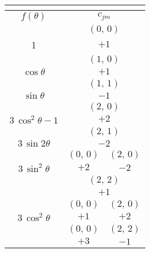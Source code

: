 \begin{table}[p]
  \centering
  \begin{tabular}{| c | c | c |}
    \multicolumn{1}{c}{\hspace*{6em}} & \multicolumn{1}{c}{\hspace*{4em}}
      & \multicolumn{1}{c}{\hspace*{4em}} \\
    \hline

    $f(\theta)$  &  \multicolumn{2}{c|}{$c_{jm}$} \\
    \hline\hline

       &  \multicolumn{2}{c|}{$(0,\,0)$}  \\
    \cline{2-3}
    1  &  \multicolumn{2}{c|}{$+1$}       \\
    \hline

       &  \multicolumn{2}{c|}{$(1,\,0)$}        \\
    \cline{2-3}
    $\cos\theta$  &  \multicolumn{2}{c|}{$+1$}  \\
    \hline

       &  \multicolumn{2}{c|}{$(1,\,1)$}        \\
    \cline{2-3}
    $\sin\theta$  &  \multicolumn{2}{c|}{$-1$}  \\
    \hline

       &  \multicolumn{2}{c|}{$(2,\,0)$}               \\
    \cline{2-3}
    $3\,\cos^2\theta-1$  &  \multicolumn{2}{c|}{$+2$}  \\
    \hline

       &  \multicolumn{2}{c|}{$(2,\,1)$}             \\
    \cline{2-3}
    $3\,\sin2\theta$  &  \multicolumn{2}{c|}{$-2$}  \\
    \hline

       &  $(0,\,0)$  &  $(2,\,0)$         \\
    \cline{2-3}
    $3\,\sin^2\theta$  &  $+2$  &  $-2$   \\
    \cline{2-3}
       &  \multicolumn{2}{c|}{$(2,\,2)$}  \\
    \cline{2-3}
       & \multicolumn{2}{c|}{$+1$}        \\
    \hline

       &  $(0,\,0)$  &  $(2,\,0)$        \\
    \cline{2-3}
    $3\,\cos^2\theta$  &  $+1$  &  $+2$  \\
    \cline{2-3}
       &  $(0,\,0)$  &  $(2,\,2)$        \\
    \cline{2-3}
       &  $+3$  &  $-1$                  \\
    \hline


\end{tabular}
\end{table}
